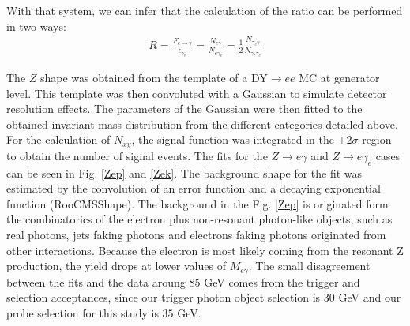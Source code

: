 With that system, we can infer that the calculation of the ratio can be performed in two ways:
\begin{eqnarray}
R  = \frac{F_{e\rightarrow \gamma}}{\epsilon_{\gamma_e}} = \frac{N_{e\gamma}}{N_{e\gamma_e}} = \frac{1}{2} \frac{N_{\gamma_e \gamma}}{N_{\gamma_e \gamma_e }}
\end{eqnarray}

The $Z$ shape was obtained from the template of a DY$\to ee$ MC at generator level. This template was then convoluted with a Gaussian to simulate detector resolution effects. The parameters of the Gaussian were then fitted to the obtained invariant mass distribution from the different categories detailed above. For the calculation of $N_{xy}$, the signal function was  integrated in the $\pm 2\sigma$ region to obtain the number of signal events. The fits for the $Z\rightarrow e \gamma$ and $Z \rightarrow e \gamma_e$ cases can be seen in Fig. \ref{Zep} and \ref{Zek}.
The background shape for the fit was estimated by the convolution of an error function and a decaying exponential function (RooCMSShape). The background in the Fig. \ref{Zep} is originated form the combinatorics of the electron plus non-resonant photon-like objects, such as real photons, jets faking photons and electrons faking photons originated from other interactions. Because the electron is most likely coming from the resonant Z production, the yield drops at lower values of $M_{e\gamma}$. The small disagreement between the fits and the data aroung $85$ GeV comes from the trigger and selection acceptances, since our trigger photon object selection is $30$ GeV and our probe selection \pt for this study is $35$ GeV. 


